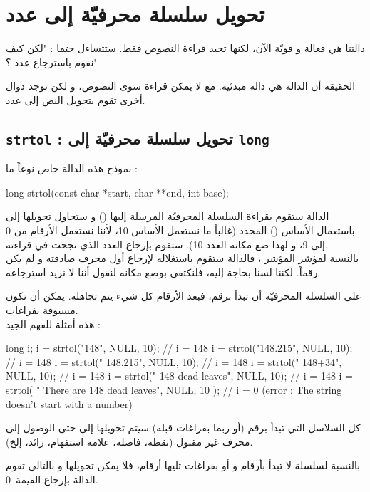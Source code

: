 \section{تحويل سلسلة محرفيّة إلى عدد}

دالتنا
هي فعالة و قويّة الآن، لكنها تجيد قراءة النصوص فقط. ستتساءل حتما : "لكن كيف نقوم باسترجاع عدد ؟"

الحقيقة أن الدالة
هي دالة مبدئية. مع
لا يمكن قراءة سوى النصوص، و لكن توجد دوال أخرى تقوم بتحويل النص إلى عدد.

\subsection{\texttt{strtol} : تحويل سلسلة محرفيّة إلى \texttt{long}}

نموذج هذه الدالة خاص نوعاً ما :

\begin{Csource}
long strtol(const char *start, char **end, int base);
\end{Csource}

الدالة ستقوم بقراءة السلسلة المحرفيّة المرسلة إليها
()
و ستحاول تحويلها إلى
باستعمال الأساس
()
المحدد (غالباً ما نستعمل الأساس 10، لأننا نستعمل الأرقام من 0 إلى 9، و لهذا ضع مكانه العدد 10). ستقوم بإرجاع العدد الذي نجحت في قراءته.\\
بالنسبة لمؤشر المؤشر
،
فالدالة ستقوم باستغلاله لإرجاع أول محرف صادفته و لم يكن رقماً. لكننا لسنا بحاجة إليه، فلنكتفي بوضع
مكانه لنقول أننا لا نريد استرجاعه.

على السلسلة المحرفيّة أن تبدأ برقم، فبعد الأرقام كل شيء يتم تجاهله. يمكن أن تكون مسبوقة بفراغات.\\
هذه أمثلة للفهم الجيد :

\begin{Csource}
long i;
i = strtol("148", NULL, 10); // i = 148
i = strtol("148.215", NULL, 10); // i = 148
i = strtol(" 148.215", NULL, 10); // i = 148
i = strtol(" 148+34", NULL, 10); // i = 148
i = strtol(" 148 dead leaves", NULL, 10); // i = 148
i = strtol( " There are 148 dead leaves", NULL, 10 ); // i = 0 (error : The string doesn't start with a number)
\end{Csource}

كل السلاسل التي تبدأ برقم (أو ربما بفراغات قبله) سيتم تحويلها إلى
حتى الوصول إلى محرف غير مقبول (نقطة، فاصلة، علامة استفهام، زائد، إلخ).

بالنسبة لسلسلة لا تبدأ بأرقام و أو بفراغات تليها أرقام، فلا يمكن تحويلها و بالتالي تقوم الدالة بإرجاع القيمة~0.

